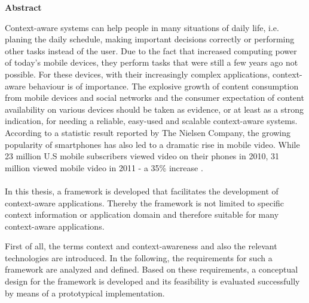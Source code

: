 \thispagestyle{empty}
\vspace*{1.0cm}

\begin{center}
    \textbf{Abstract}
\end{center}

\vspace*{0.5cm}

\noindent
Context-aware systems can help people in many situations of daily life, i.e. planing the daily schedule, making important decisions correctly or performing other tasks instead of the user.
Due to the fact that increased computing power of today's mobile devices, they perform tasks that were still a few years ago not possible. For these devices, with their increasingly complex applications, context-aware behaviour is of importance. The explosive growth of content consumption from mobile devices and social networks and the consumer expectation of content availability on various devices should be taken as evidence, or at least as a strong indication, for needing a reliable, easy-used and scalable context-aware systems.%
According to a statistic result reported by The Nielsen Company, the growing popularity of smartphones has also led to a dramatic rise in mobile video. While 23 million U.S mobile subscribers viewed video on their phones in 2010, 31 million viewed mobile video in 2011 - a 35\% increase \cite{mobile-media-report}. 
\\
\\
In this thesis, a framework is developed that facilitates the development of context-aware applications. Thereby the framework is not limited to specific context information or application domain and therefore suitable for many context-aware applications.

First of all, the terms context and context-awareness and also the relevant technologies are introduced. In the following, the requirements for such a framework are analyzed and defined. Based on these requirements, a conceptual design for the framework is developed and its feasibility is evaluated successfully by means of a prototypical implementation.


